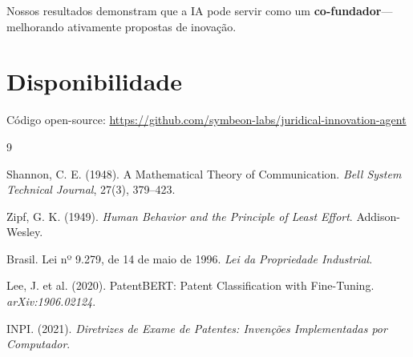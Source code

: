 \documentclass[12pt,a4paper]{article}
\begin{document}
Nossos resultados demonstram que a IA pode servir como um \textbf{co-fundador}---melhorando ativamente propostas de inovação.

\section*{Disponibilidade}

Código open-source: \url{https://github.com/symbeon-labs/juridical-innovation-agent}

\begin{thebibliography}{9}

Shannon, C. E. (1948). A Mathematical Theory of Communication. \textit{Bell System Technical Journal}, 27(3), 379--423.

Zipf, G. K. (1949). \textit{Human Behavior and the Principle of Least Effort}. Addison-Wesley.

Brasil. Lei nº 9.279, de 14 de maio de 1996. \textit{Lei da Propriedade Industrial}.

Lee, J. et al. (2020). PatentBERT: Patent Classification with Fine-Tuning. \textit{arXiv:1906.02124}.

INPI. (2021). \textit{Diretrizes de Exame de Patentes: Invenções Implementadas por Computador}.

\end{thebibliography}
\end{document}
